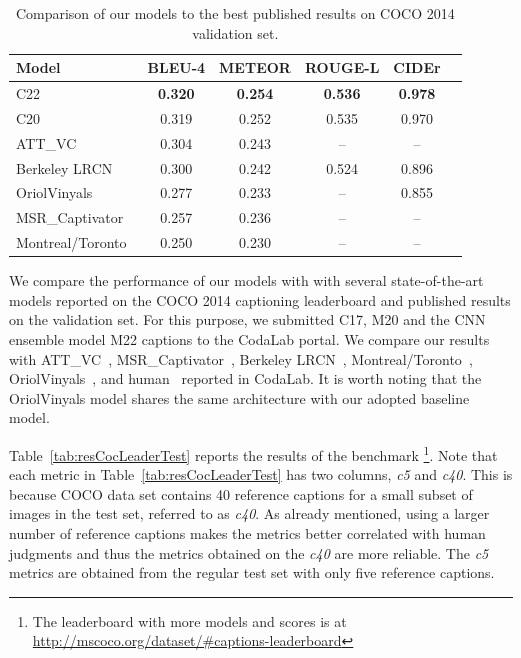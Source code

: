 \begin{table}[htp]
  \centering
  \begin{adjustbox}{center}
  \begin{tabular}{|l|c|c|c|c|c|}
    \hline\hline
    \bf Model  &BLEU-4 &METEOR &ROUGE-L&CIDEr\\\hline
    C22 & \bf0.320&\bf0.254 &\bf0.536 &\bf0.978 \\
    C20 & 0.319 & 0.252 & 0.535 & 0.970 \\\hline
    ATT\_VC~\cite{you2016image} & 0.304& 0.243& -- & -- \\
    Berkeley LRCN~\cite{donahue2015long} & 0.300& 0.242& 0.524 & 0.896 \\
    OriolVinyals~\cite{Vinyals_2015_CVPR} & 0.277& 0.233& -- & 0.855 \\
    MSR\_Captivator~\cite{Fang2015} & 0.257& 0.236& -- & -- \\
    Montreal/Toronto~\cite{Xu2015show} & 0.250& 0.230& -- & -- \\
    \hline \hline
  \end{tabular}
  \end{adjustbox}
  \caption{Comparison of our models to the best published results on COCO 2014 validation set.}
  \label{tab:resCocPubVal}
\end{table}

We compare the performance of our models with with several state-of-the-art
models reported on the COCO 2014 captioning leaderboard and published results on
the validation set.
For this purpose, we submitted C17, M20 and the CNN ensemble model M22 captions
to the CodaLab portal.
We compare our results with ATT\_VC~\cite{you2016image},
MSR\_Captivator~\cite{Fang2015}, Berkeley LRCN~\cite{donahue2015long},
Montreal/Toronto~\cite{Xu2015show}, OriolVinyals~\cite{Vinyals_2015_CVPR}, and
human~\cite{Chen2015} reported in CodaLab. It is worth noting that the
OriolVinyals model shares the same architecture with our adopted baseline model.

Table~\ref{tab:resCocLeaderTest} reports the results of the benchmark%
\footnote{The leaderboard with more models and
scores is at \url{http://mscoco.org/dataset/\#captions-leaderboard}}.
Note that each metric in Table~\ref{tab:resCocLeaderTest} has two columns, \emph{c5}
and \emph{c40}. 
This is because COCO data set contains 40 reference captions for a small subset
of images in the test set, referred to as \emph{c40}. 
As already mentioned, using a larger number of reference captions makes the
metrics better correlated with human judgments and thus the metrics obtained on
the \emph{c40} are more reliable.
The \emph{c5} metrics are obtained from the regular test set with only five
reference captions. 


